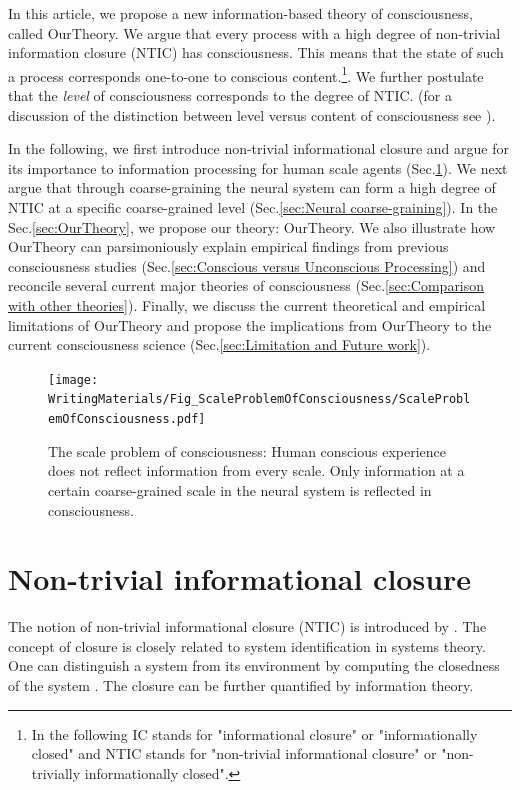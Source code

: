 \documentclass[utf8]{article}
\begin{document}
		In this article, we propose a new information-based theory of consciousness, called \ac{OurTheory}. We argue that every process with a high degree of non-trivial information closure (NTIC) has consciousness. This means that the state of such a process corresponds one-to-one to conscious content.\footnote{In the following IC stands for "informational closure" or "informationally closed" and NTIC stands for "non-trivial informational closure" or "non-trivially informationally closed".}. We further postulate that the \textit{level} of consciousness corresponds to the degree of NTIC. (for a discussion of the distinction between level versus content of consciousness see \cite{laureys2005neural, overgaard2010neural}).
		
		In the following, we first introduce non-trivial informational closure and argue for its importance to information processing for human scale agents (Sec.\ref{sec:Non-trivial informational closure}). We next argue that through coarse-graining the neural system can form a high degree of NTIC at a specific coarse-grained level (Sec.\ref{sec:Neural coarse-graining}). In the Sec.\ref{sec:OurTheory}, we propose our theory: \acf{OurTheory}. We also illustrate how \ac{OurTheory} can parsimoniously explain empirical findings from previous consciousness studies (Sec.\ref{sec:Conscious versus Unconscious Processing}) and reconcile several current major theories of consciousness (Sec.\ref{sec:Comparison with other theories}). Finally, we discuss the current theoretical and empirical limitations of \ac{OurTheory} and propose the implications from \ac{OurTheory} to the current consciousness science (Sec.\ref{sec:Limitation and Future work}). 


		\begin{figure}[H]
		    \centering
			\texttt{[image: WritingMaterials/Fig\_ScaleProblemOfConsciousness/ScaleProblemOfConsciousness.pdf]}
			\caption{The scale problem of consciousness: Human conscious experience does not reflect information from every scale. Only information at a certain coarse-grained scale in the neural system is reflected in consciousness.}
			\label{fig:scaleproblem}
	   	\end{figure}


	\section{Non-trivial informational closure} \label{sec:Non-trivial informational closure}
		The notion of non-trivial informational closure (NTIC) is introduced by \cite{BERTSCHINGER.2006}. The concept of closure is closely related to system identification in systems theory. One can distinguish a system from its environment by computing the closedness of the system \citep{maturana1991autopoiesis, rosen1991life, pattee2012evolving, luhmann1995probleme}. The closure can be further quantified by information theory.
\end{document}
